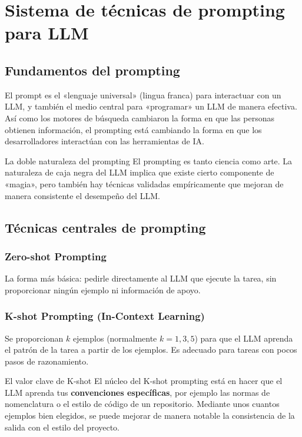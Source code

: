 \section{Sistema de técnicas de prompting para LLM}

\subsection{Fundamentos del prompting}

El prompt es el «lenguaje universal» (lingua franca) para interactuar con un LLM, y también el medio central para «programar» un LLM de manera efectiva. Así como los motores de búsqueda cambiaron la forma en que las personas obtienen información, el prompting está cambiando la forma en que los desarrolladores interactúan con las herramientas de IA.

\begin{knowledgebox}{La doble naturaleza del prompting}
El prompting es tanto ciencia como arte. La naturaleza de caja negra del LLM implica que existe cierto componente de «magia», pero también hay técnicas validadas empíricamente que mejoran de manera consistente el desempeño del LLM.
\end{knowledgebox}

\subsection{Técnicas centrales de prompting}

\subsubsection{Zero-shot Prompting}

La forma más básica: pedirle directamente al LLM que ejecute la tarea, sin proporcionar ningún ejemplo ni información de apoyo.

\subsubsection{K-shot Prompting (In-Context Learning)}

Se proporcionan $k$ ejemplos (normalmente $k = 1, 3, 5$) para que el LLM aprenda el patrón de la tarea a partir de los ejemplos. Es adecuado para tareas con pocos pasos de razonamiento.

\begin{importantbox}{El valor clave de K-shot}
El núcleo del K-shot prompting está en hacer que el LLM aprenda tus \textbf{convenciones específicas}, por ejemplo las normas de nomenclatura o el estilo de código de un repositorio. Mediante unos cuantos ejemplos bien elegidos, se puede mejorar de manera notable la consistencia de la salida con el estilo del proyecto.
\end{importantbox}

